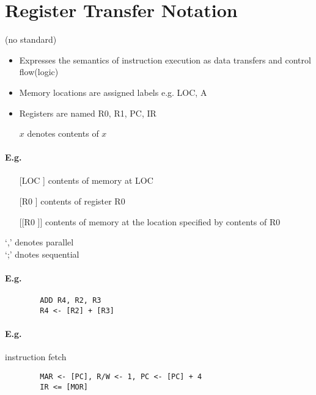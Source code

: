 \documentclass[12pt]{report}
\begin{document}
  \section{Register Transfer Notation}
    (no standard)
    \begin{itemize}
      \item Expresses the semantics of instruction execution as data transfers
      and control flow(logic)
      \item Memory locations are assigned labels e.g. LOC, A
      \item Registers are named R0, R1, PC, IR
      \item [$x$] denotes contents of $x$
    \end{itemize}
    \paragraph{E.g.}
    \begin{itemize}
      \item [[LOC]] contents of memory at LOC
      \item [[R0]] contents of register R0
      \item [[[R0]]] contents of memory at the location specified by contents of R0
    \end{itemize}
    `,' denotes parallel\\
    `;' dnotes sequential\\

    \paragraph{E.g.}
      \begin{lstlisting}
        ADD R4, R2, R3
        R4 <- [R2] + [R3]
      \end{lstlisting}

    \paragraph{E.g.} instruction fetch
      \begin{lstlisting}
        MAR <- [PC], R/W <- 1, PC <- [PC] + 4
        IR <= [MOR]
      \end{lstlisting}
\end{document}
